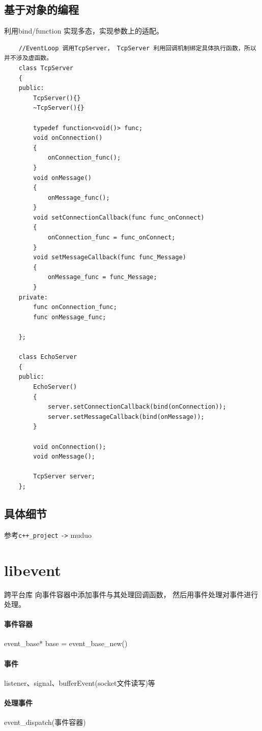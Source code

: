\documentclass[UTF8,a4paper,12pt]{ctexbook}
\begin{document}
		\subsection{基于对象的编程}利用bind/function 实现多态，实现参数上的适配。
			\begin{lstlisting}
	//EventLoop 调用TcpServer， TcpServer 利用回调机制绑定具体执行函数，所以并不涉及虚函数。 		
	class TcpServer
	{
	public:
		TcpServer(){}
		~TcpServer(){}
		
		typedef function<void()> func;
		void onConnection()
		{
			onConnection_func();
		}
	    void onMessage()
	    {
		    onMessage_func();
	    }
	    void setConnectionCallback(func func_onConnect)
	    {
		    onConnection_func = func_onConnect;
	    }
	    void setMessageCallback(func func_Message)
	    {
		    onMessage_func = func_Message;
	    }
    private:
	    func onConnection_func;
	    func onMessage_func;
	    
	};
				
	class EchoServer
	{
	public:
		EchoServer()
		{
			server.setConnectionCallback(bind(onConnection));
			server.setMessageCallback(bind(onMessage));
		}
		
		void onConnection();
		void onMessage();
		
		TcpServer server;
	};
			\end{lstlisting} 
		\subsection{具体细节}参考\verb|c++_project| \verb|->| muduo
		
	\section{libevent }跨平台库
		向事件容器中添加事件与其处理回调函数， 然后用事件处理对事件进行处理。
		
		\paragraph{事件容器}event\_base* base = event\_base\_new()
		
		\paragraph{事件}listener、signal、bufferEvent(socket文件读写)等
		
		\paragraph{处理事件}event\_dispatch(事件容器)
	
\end{document}
